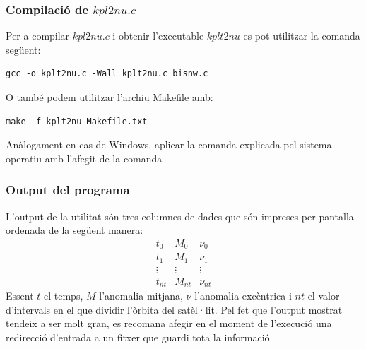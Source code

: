 \documentclass[12pt]{article}
\begin{document}
\subsubsection{Compilació de $kpl2nu.c$}
Per a compilar $kpl2nu.c$ i obtenir l'executable $kplt2nu$ es pot utilitzar la comanda següent:
\begin{verbatim}
gcc -o kplt2nu.c -Wall kplt2nu.c bisnw.c
\end{verbatim}
O també podem utilitzar l'archiu Makefile amb:
\begin{verbatim}
make -f kplt2nu Makefile.txt
\end{verbatim}
Anàlogament en cas de Windows, aplicar la comanda explicada pel sistema operatiu amb l'afegit de la comanda
\subsubsection{Output del programa}
L'output de la utilitat són tres columnes de dades que són impreses per pantalla ordenada de la següent manera:
$$
\begin{array}{ccc}
t_0 & M_0 & \nu_0 \\
t_1 & M_1 & \nu_1 \\
\vdots & \vdots & \vdots \\
t_{nt} & M_{nt} & \nu_{nt}
\end{array}$$
Essent $t$ el temps, $M$ l'anomalia mitjana, $\nu$ l'anomalia excèntrica i $nt$ el valor d'intervals en el que dividir l'òrbita del satèl·lit.
\newline
Pel fet que l'output mostrat tendeix a ser molt gran, es recomana afegir en el moment de l'execució una redirecció d'entrada a un fitxer que guardi tota la informació.
\newpage
\end{document}
